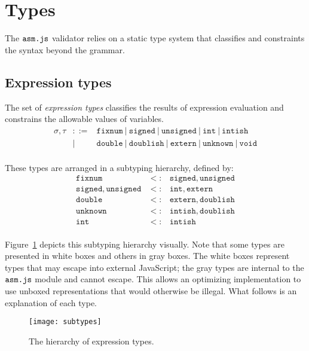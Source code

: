 \documentclass{article}
\newcommand{\mathjs}[1]{\mbox{\texttt{{#1}}}}
\newcommand{\bit}{\mathtt{bit}}
\newcommand{\unsigned}{\mathtt{unsigned}}
\newcommand{\signed}{\mathtt{signed}}
\newcommand{\fixnum}{\mathtt{fixnum}}
\newcommand{\double}{\mathtt{double}}
\newcommand{\extern}{\mathtt{extern}}
\newcommand{\unk}{\mathtt{unknown}}
\newcommand{\void}{\mathtt{void}}
\renewcommand{\int}{\mathtt{int}}
\newcommand{\boolish}{\mathtt{boolish}}
\newcommand{\intish}{\mathtt{intish}}
\newcommand{\doublish}{\mathtt{doublish}}
\begin{document}
\section{Types}
\label{sec:types}

The $\mathjs{asm.js}$ validator relies on a static type system that
classifies and constraints the syntax beyond the grammar.

\subsection{Expression types}

The set of {\it expression types} classifies the results of expression
evaluation and constrains the allowable values of variables.
\[
\begin{array}{rcl}
\sigma, \tau & ::= & \fixnum ~|~ \signed ~|~ \unsigned ~|~ \int ~|~ \intish \\
             &  |  & \double ~|~ \doublish ~|~ \extern ~|~ \unk ~|~ \void \\
\end{array}
\]

These types are arranged in a subtyping hierarchy, defined by:
\[
\begin{array}{rcl}
\fixnum            & <: & \signed, \unsigned \\
\signed, \unsigned & <: & \int, \extern \\
\double            & <: & \extern, \doublish \\
\unk               & <: & \intish, \doublish \\
\int               & <: & \intish \\
\end{array}
\]

Figure~\ref{fig:subtypes} depicts this subtyping hierarchy
visually. Note that some types are presented in white boxes and others
in gray boxes. The white boxes represent types that may escape into
external JavaScript; the gray types are internal to the
$\mathjs{asm.js}$ module and cannot escape. This allows an optimizing
implementation to use unboxed representations that would otherwise be
illegal. What follows is an explanation of each type.

\begin{figure}[tb]
\centering
\texttt{[image: subtypes]}
\caption{The hierarchy of expression types.}
\label{fig:subtypes}
\end{figure}
\end{document}
